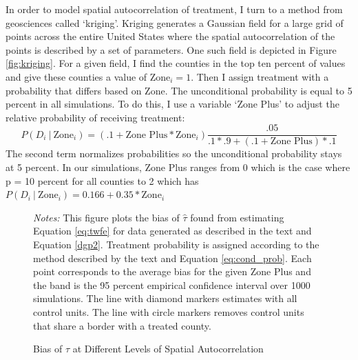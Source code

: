 \documentclass[11pt]{article}
\begin{document}
In order to model spatial autocorrelation of treatment, I turn to a method from geosciences called `kriging'. Kriging generates a Gaussian field for a large grid of points across the entire United States where the spatial autocorrelation of the points is described by a set of parameters. One such field is depicted in Figure \ref{fig:kriging}. For a given field, I find the counties in the top ten percent of values and give these counties a value of $\text{Zone}_i = 1$. Then I assign treatment with a probability that differs based on Zone. The unconditional probability is equal to 5 percent in all simulations. To do this, I use a variable `Zone Plus' to adjust the relative probability of receiving treatment: 
\begin{equation}
    \label{eq:cond_prob}
    P(D_i \ \vert \ \text{Zone}_i) = (.1 + \text{Zone Plus} * \text{Zone}_i) \frac{.05}{.1 * .9 + (.1 + \text{Zone Plus}) * .1}
\end{equation}
The second term normalizes probabilities so the unconditional probability stays at 5 percent. In our simulations, Zone Plus ranges from 0 which is the case where p = 10 percent for all counties to 2 which has $P(D_i \ \vert \ \text{Zone}_i) = 0.166 + 0.35 * \text{Zone}_i$

\begin{figure}[t]
    \caption{Bias of $\hat{\tau}$ at Different Levels of Spatial Autocorrelation}
    \label{fig:bias_spatial_autocorr}
    {\centering
    }
    {\footnotesize
        \textit{Notes:} This figure plots the bias of $\hat{\tau}$ found from estimating Equation \ref{eq:twfe} for data generated as described in the text and Equation \ref{dgp2}. Treatment probability is assigned according to the method described by the text and Equation \ref{eq:cond_prob}. Each point corresponds to the average bias for the given Zone Plus and the band is the 95 percent empirical confidence interval over 1000 simulations. The line with diamond markers estimates with all control units. The line with circle markers removes control units that share a border with a treated county. 
    }
\end{figure}
\end{document}
